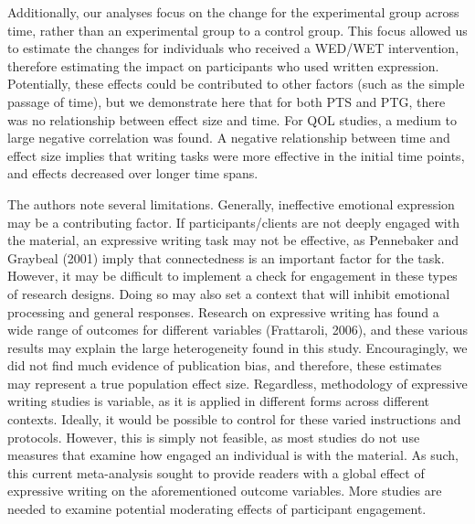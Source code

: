 \documentclass[,man]{apa6}
\begin{document}
Additionally, our analyses focus on the change for the experimental group across time, rather than an experimental group to a control group. This focus allowed us to estimate the changes for individuals who received a WED/WET intervention, therefore estimating the impact on participants who used written expression. Potentially, these effects could be contributed to other factors (such as the simple passage of time), but we demonstrate here that for both PTS and PTG, there was no relationship between effect size and time. For QOL studies, a medium to large negative correlation was found. A negative relationship between time and effect size implies that writing tasks were more effective in the initial time points, and effects decreased over longer time spans.

The authors note several limitations. Generally, ineffective emotional expression may be a contributing factor. If participants/clients are not deeply engaged with the material, an expressive writing task may not be effective, as Pennebaker and Graybeal (2001) imply that connectedness is an important factor for the task. However, it may be difficult to implement a check for engagement in these types of research designs. Doing so may also set a context that will inhibit emotional processing and general responses. Research on expressive writing has found a wide range of outcomes for different variables (Frattaroli, 2006), and these various results may explain the large heterogeneity found in this study. Encouragingly, we did not find much evidence of publication bias, and therefore, these estimates may represent a true population effect size. Regardless, methodology of expressive writing studies is variable, as it is applied in different forms across different contexts. Ideally, it would be possible to control for these varied instructions and protocols. However, this is simply not feasible, as most studies do not use measures that examine how engaged an individual is with the material. As such, this current meta-analysis sought to provide readers with a global effect of expressive writing on the aforementioned outcome variables. More studies are needed to examine potential moderating effects of participant engagement.
\end{document}
